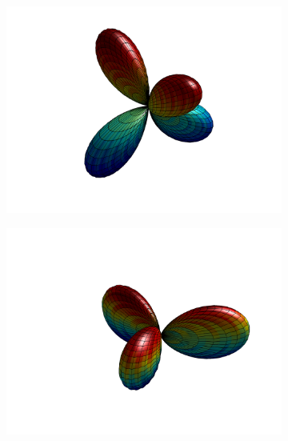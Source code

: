 \begin{figure}
\begin{subfigure}[b]{0.40\textwidth}
		\includegraphics[width=\textwidth]{figures/appendices/Y_3_2.png}
		\caption{}
	\end{subfigure}
	\vfill
	\begin{subfigure}[b]{0.40\textwidth}
		\centering
		\includegraphics[width=\textwidth]{figures/appendices/Y_3_-3.png}
		\caption{}
	\end{subfigure}
	\hfill
	\begin{subfigure}[b]{0.40\textwidth}
		\centering

\end{subfigure}
\end{figure}
